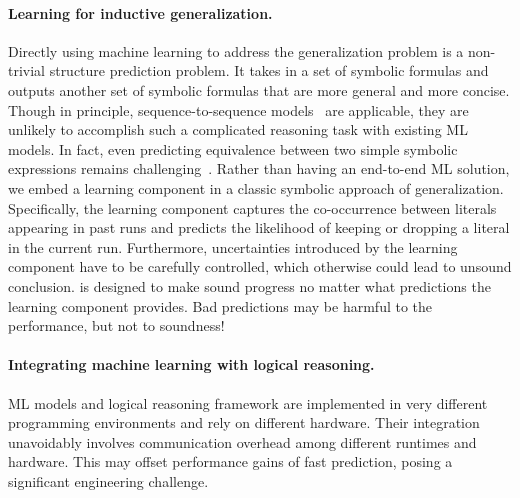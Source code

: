 \paragraph{Learning for inductive generalization.}
Directly using machine learning to address the generalization problem
is a non-trivial structure prediction problem. It takes in a set of symbolic
formulas and outputs another set of symbolic formulas that are more
general and more concise. Though in principle, sequence-to-sequence
models~\cite{lample2019deep} are applicable, they are unlikely to accomplish such a
complicated reasoning task with existing ML models. In fact, even predicting
equivalence between two simple symbolic expressions remains
challenging~\cite{Allamanis:icml17}. Rather than having an end-to-end ML
solution, we embed a learning component in a classic symbolic approach of
generalization. Specifically, the learning component captures the
co-occurrence between literals appearing in past runs and predicts the likelihood
of keeping or dropping a literal in the current run.
Furthermore, uncertainties introduced by the learning component 
have to be carefully controlled, which otherwise could lead to
unsound conclusion. \dpy is designed to make sound progress no 
matter what predictions the learning component provides. Bad
predictions may be harmful to the performance, but not to soundness! 
   
    
\paragraph{Integrating machine learning with logical reasoning.}
ML models and logical reasoning framework are implemented in very different
programming environments and rely on different hardware. Their
integration unavoidably involves communication overhead among different runtimes and
hardware. This may offset performance gains of fast prediction, posing a significant engineering challenge. 
%


